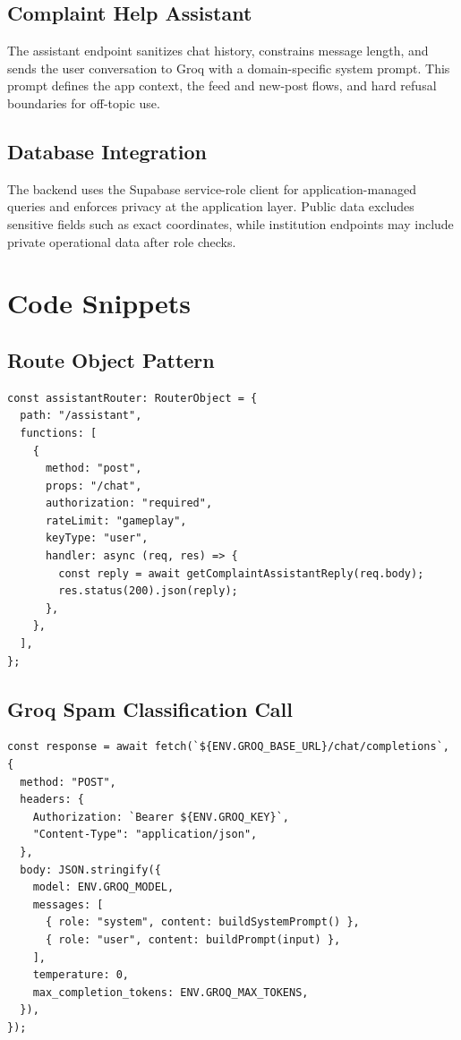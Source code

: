 \documentclass[12pt,a4paper]{report}
\begin{document}
\subsection{Complaint Help Assistant}
The assistant endpoint sanitizes chat history, constrains message length, and sends the user conversation to Groq with a domain-specific system prompt. This prompt defines the app context, the feed and new-post flows, and hard refusal boundaries for off-topic use.

\subsection{Database Integration}
The backend uses the Supabase service-role client for application-managed queries and enforces privacy at the application layer. Public data excludes sensitive fields such as exact coordinates, while institution endpoints may include private operational data after role checks.

\section{Code Snippets}
\subsection*{Route Object Pattern}
\begin{lstlisting}[caption={Express route-object pattern used in the backend}]
const assistantRouter: RouterObject = {
  path: "/assistant",
  functions: [
    {
      method: "post",
      props: "/chat",
      authorization: "required",
      rateLimit: "gameplay",
      keyType: "user",
      handler: async (req, res) => {
        const reply = await getComplaintAssistantReply(req.body);
        res.status(200).json(reply);
      },
    },
  ],
};
\end{lstlisting}

\subsection*{Groq Spam Classification Call}
\begin{lstlisting}[caption={Groq-based spam filtering request pattern}]
const response = await fetch(`${ENV.GROQ_BASE_URL}/chat/completions`, {
  method: "POST",
  headers: {
    Authorization: `Bearer ${ENV.GROQ_KEY}`,
    "Content-Type": "application/json",
  },
  body: JSON.stringify({
    model: ENV.GROQ_MODEL,
    messages: [
      { role: "system", content: buildSystemPrompt() },
      { role: "user", content: buildPrompt(input) },
    ],
    temperature: 0,
    max_completion_tokens: ENV.GROQ_MAX_TOKENS,
  }),
});
\end{lstlisting}
\end{document}
